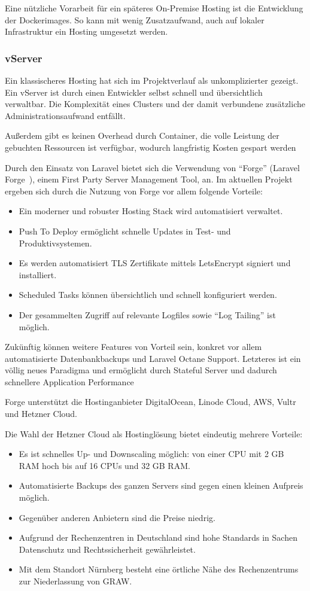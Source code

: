 Eine nützliche Vorarbeit für ein späteres On-Premise Hosting ist die Entwicklung der Dockerimages.
So kann mit wenig Zusatzaufwand, auch auf lokaler Infrastruktur ein Hosting umgesetzt werden.
\newpage

\subsubsection{vServer}
Ein klassischeres Hosting hat sich im Projektverlauf als unkomplizierter gezeigt.
Ein vServer ist durch einen Entwickler selbst schnell und übersichtlich verwaltbar.
Die Komplexität eines Clusters und der damit verbundene zusätzliche Administrationsaufwand entfällt.

Außerdem gibt es keinen Overhead durch Container, die volle Leistung der gebuchten Ressourcen ist verfügbar, wodurch langfristig Kosten gespart werden

Durch den Einsatz von Laravel bietet sich die Verwendung von \enquote{Forge} (Laravel Forge~\cite{laravel-forge}), einem First Party Server Management Tool, an.
Im aktuellen Projekt ergeben sich durch die Nutzung von Forge vor allem folgende Vorteile:
\begin{itemize}
    \item Ein moderner und robuster Hosting Stack wird automatisiert verwaltet.
    \item Push To Deploy ermöglicht schnelle Updates in Test- und Produktivsystemen.
    \item Es werden automatisiert TLS Zertifikate mittels LetsEncrypt signiert und installiert.
    \item Scheduled Tasks können übersichtlich und schnell konfiguriert werden.
    \item Der gesammelten Zugriff auf relevante Logfiles sowie \enquote{Log Tailing} ist möglich.
\end{itemize}

Zukünftig können weitere Features von Vorteil sein, konkret vor allem automatisierte Datenbankbackups und Laravel Octane Support.
Letzteres ist ein völlig neues Paradigma und ermöglicht durch Stateful Server und dadurch schnellere Application Performance\cite{laravel-octane}

Forge unterstützt die Hostinganbieter DigitalOcean, Linode Cloud, AWS, Vultr und Hetzner Cloud.

Die Wahl der Hetzner Cloud als Hostinglösung bietet eindeutig mehrere Vorteile:
\begin{itemize}
    \item Es ist schnelles Up- und Downscaling möglich: von einer CPU mit 2 GB RAM hoch bis auf 16 CPUs und 32 GB RAM.
    \item Automatisierte Backups des ganzen Servers sind gegen einen kleinen Aufpreis möglich.
    \item Gegenüber anderen Anbietern sind die Preise niedrig.
    \item Aufgrund der Rechenzentren in Deutschland sind hohe Standards in Sachen Datenschutz und Rechtssicherheit gewährleistet.
    \item Mit dem Standort Nürnberg besteht eine örtliche Nähe des Rechenzentrums zur Niederlassung von GRAW.
\end{itemize}
